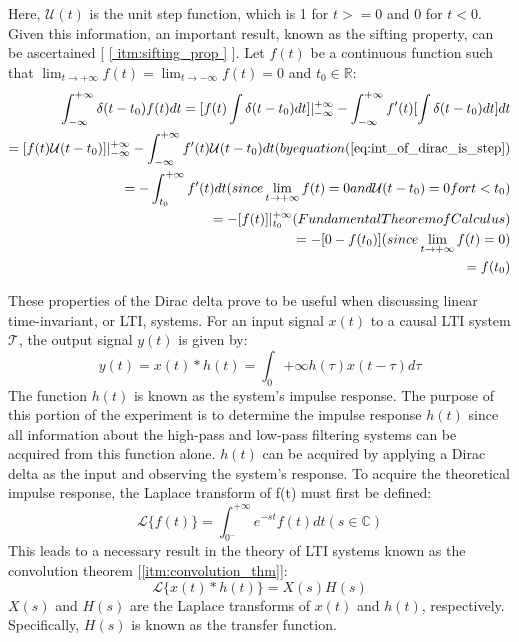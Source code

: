 Here, $\mathcal{U}(t)$ is the unit step function, which is 1 for $t >= 0$ and 0 for $t < 0$. Given this information, an important result, known as the sifting property, can be ascertained [ \ref{ itm:sifting_prop } ]. Let $f(t)$ be a continuous function such that $\lim_{ t \to +\infty } f(t) = \lim_{ t \to -\infty } f(t) = 0$ and $t_0 \in \mathbb{R}$:
\begin{equation*}
	\label{eq:sifting_property}
	\begin{aligned}
	\int_{-\infty}^{+\infty} \delta( t - t_0 ) f(t) dt = [ f(t)\int \delta( t - t_0 ) dt ]\rvert_{-\infty}^{+\infty} - \int_{-\infty}^{+\infty} f'(t)[ \int \delta( t - t_0 ) dt ]dt \\
							   = [ f(t)\mathcal{U}( t - t_0 ) ]\rvert_{-\infty}^{+\infty} - \int_{-\infty}^{+\infty} f'(t)\mathcal{U}( t - t_0 )dt ( by equation (\ref{eq:int_of_dirac_is_step}) \\
							   = -\int_{t_0}^{+\infty} f'(t)dt ( since \lim_{ t \to +\infty } f(t) = 0 and \mathcal{U}( t - t_0 ) = 0 for t < t_0 ) \\
							   = -[ f(t) ]\rvert_{t_0}^{+\infty} ( Fundamental Theorem of Calculus ) \\
							   = -[ 0 - f(t_0) ] ( since \lim_{ t \to +\infty } f(t) = 0 ) \\
							   = f(t_0) \\
	\end{aligned}
\end{equation*}

These properties of the Dirac delta prove to be useful when discussing linear time-invariant, or LTI, systems. For an input signal $x(t)$ to a causal LTI system $\mathcal{T}$, the output signal $y(t)$ is given by:
\begin{equation}
	\label{eq:causal_lti_conv}
	y(t) = x(t) * h(t) = \int_{0}{+\infty} h(\tau)x(t-\tau)d\tau
\end{equation}
The function $h(t)$ is known as the system's impulse response. The purpose of this portion of the experiment is to determine the impulse response $h(t)$ since all information about the high-pass and low-pass filtering systems can be acquired from this function alone. $h(t)$ can be acquired by applying a Dirac delta as the input and observing the system's response.
To acquire the theoretical impulse response, the Laplace transform of f(t) must first be defined:
\begin{equation}
	\label{eq:lt_def}
	\mathcal{L}\{f(t)\} = \int_{0^{-}}^{+\infty} e^{-st}f(t)dt ( s \in \mathbb{C} )
\end{equation}
This leads to a necessary result in the theory of LTI systems known as the convolution theorem [\ref{itm:convolution_thm}]:
\begin{equation}
	\label{eq:conv_thm}
	\mathcal{L}\{ x(t) * h(t) \} = X(s)H(s)
\end{equation}
$X(s)$ and $H(s)$ are the Laplace transforms of $x(t)$ and $h(t)$, respectively. Specifically, $H(s)$ is known as the transfer function.

